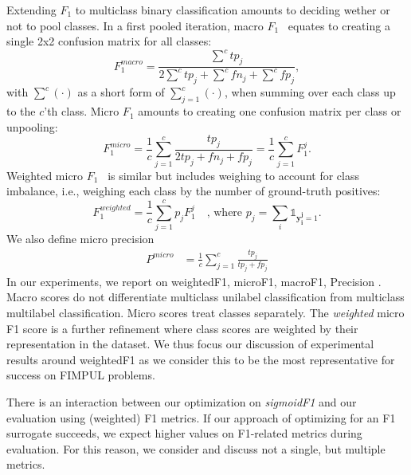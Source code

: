 Extending \(F_1\) to multiclass binary classification amounts to deciding wether or not to pool classes.
In a first pooled iteration, macro \(F_1\)~\cite{multilabelMetrics} equates to creating a single 2x2 confusion matrix for all classes:
%
\begin{equation}
F_1^{macro} = \frac{\sum^c tp_j}{2 \sum^c tp_j + \sum^c fn_j + \sum^c fp_j},
\end{equation}
%
with $\sum^c (\cdot)$ as a short form of $\sum_{j=1}^c(\cdot)$, when summing over each class up to the $c$'th class.
Micro \(F_1\) \cite{threshForF1, multilabelMetrics} amounts to creating one confusion matrix per class or unpooling:
%
\begin{equation}
F_1^{micro} =  \frac{1}{c} \sum_{j=1}^c \frac{tp_j}{2 tp_j + fn_j + fp_j} =  \frac{1}{c} \sum_{j=1}^c F_1^j.
\end{equation}
%
Weighted micro \(F_1\)~\cite{weightedMetrics} is similar but includes weighing to account for class imbalance, i.e., weighing each class by the number of ground-truth positives:
%
\begin{equation}
F_1^{weighted} = \frac{1}{c} \sum_{j=1}^c p_j F_1^j \quad \text{, where } p_j = \sum_i \mathds{1}_{\mathbf{y_i^j} = 1}.
\end{equation}
%
We also define micro precision%
%
\begin{equation}
\begin{aligned} P^{micro} &=  \frac{1}{c} \sum_{j=1}^c \frac{tp_j}{tp_j+fp_j}%
\end{aligned}
\end{equation}
%
In our experiments, we report on weightedF1, microF1, macroF1, Precision%
. Macro scores do not differentiate multiclass unilabel classification from multiclass multilabel classification. Micro scores treat classes separately. The \emph{weighted} micro F1 score is a further refinement where class scores are weighted by their representation in the dataset. We thus focus our discussion of experimental results around weightedF1 as we consider this to be the most representative for success on FIMPUL problems.

There is an interaction between our optimization on \emph{sigmoidF1} and our evaluation using (weighted) F1 metrics. If our approach of optimizing for an F1 surrogate succeeds, we expect higher values on F1-related metrics during evaluation. For this reason, we consider and discuss not a single, but multiple metrics.

